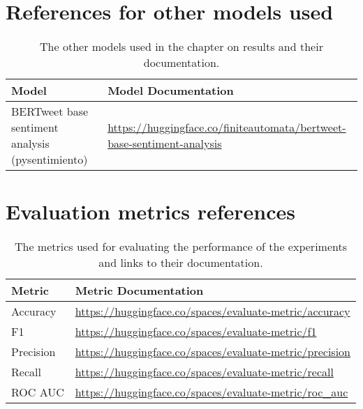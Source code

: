 \section{References for other models used}
\begin{table}[ht]
    \captionsetup{font=small}
    \centering
    \begin{tabularx}{\textwidth}{|l|X|}
        \hline
        \rowcolor[gray]{0.7}
        \textbf{Model}                                   & \textbf{Model Documentation}                                                         \\
        \hline
        BERTweet base sentiment analysis (pysentimiento) & \small{\url{https://huggingface.co/finiteautomata/bertweet-base-sentiment-analysis}} \\
        \hline
    \end{tabularx}
    \caption{The other models used in the chapter on results and their documentation.}
    \label{tab: apdxb_other_model_doc}
\end{table}

\section{Evaluation metrics references}

\begin{table}[ht]
    \captionsetup{font=small}
    \centering
    \begin{tabularx}{\textwidth}{|l|X|}
        \hline
        \rowcolor[gray]{0.7}
        \textbf{Metric} & \textbf{Metric Documentation}                                         \\
        \hline

        Accuracy        & \small{\url{https://huggingface.co/spaces/evaluate-metric/accuracy}}  \\
        \hline
        F1              & \small{\url{https://huggingface.co/spaces/evaluate-metric/f1}}        \\
        \hline
        Precision       & \small{\url{https://huggingface.co/spaces/evaluate-metric/precision}} \\
        \hline
        Recall          & \small{\url{https://huggingface.co/spaces/evaluate-metric/recall}}    \\
        \hline
        ROC AUC         & \small{\url{https://huggingface.co/spaces/evaluate-metric/roc_auc}}   \\
        \hline
    \end{tabularx}
    \caption{The metrics used for evaluating the performance of the experiments and links to their documentation.}
    \label{tab: apdxb_metric_doc}
\end{table}

